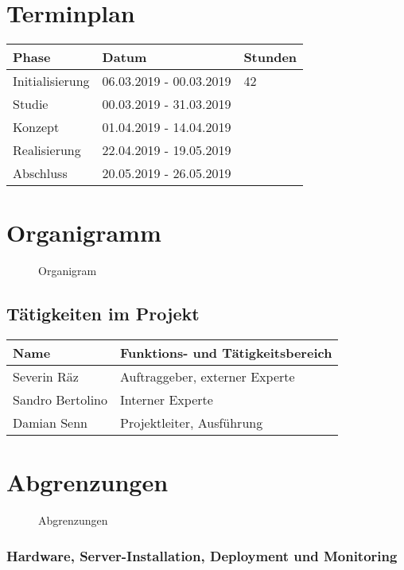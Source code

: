 \section{Terminplan}\label{terminplan}

\begin{longtable}[]{@{}lll@{}}
\toprule
Phase & Datum & Stunden\tabularnewline
\midrule
\endhead
Initialisierung & 06.03.2019 - 00.03.2019 & 42\tabularnewline
Studie & 00.03.2019 - 31.03.2019 &\tabularnewline
Konzept & 01.04.2019 - 14.04.2019 &\tabularnewline
Realisierung & 22.04.2019 - 19.05.2019 &\tabularnewline
Abschluss & 20.05.2019 - 26.05.2019 &\tabularnewline
\bottomrule
\end{longtable}

\clearpage

\section{Organigramm}\label{organigramm}

\begin{figure}[!htb]
  \centering
  \def\svgwidth{\columnwidth}
  
  \caption{Organigram}
\end{figure}

\subsection{Tätigkeiten im Projekt}\label{tuxe4tigkeiten-im-projekt}

\begin{longtable}[]{@{}ll@{}}
\toprule
Name & Funktions- und Tätigkeitsbereich\tabularnewline
\midrule
\endhead
Severin Räz & Auftraggeber, externer Experte\tabularnewline
Sandro Bertolino & Interner Experte\tabularnewline
Damian Senn & Projektleiter, Ausführung\tabularnewline
\bottomrule
\end{longtable}

\clearpage

\section{Abgrenzungen}\label{abgrenzungen}

\begin{figure}[!htb]
  \centering
  \def\svgwidth{\columnwidth}
  
  \caption{Abgrenzungen}
\end{figure}

\subsubsection{Hardware, Server-Installation, Deployment und
Monitoring}\label{hardware-server-installation-deployment-und-monitoring}

